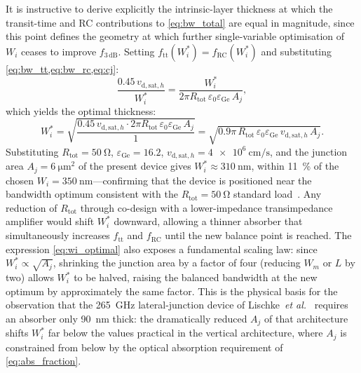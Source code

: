 
It is instructive to derive explicitly the intrinsic-layer thickness at which
the transit-time and RC contributions to \cref{eq:bw_total} are equal in
magnitude, since this point defines the geometry at which further single-variable
optimisation of $W_i$ ceases to improve $f_{3\,\mathrm{dB}}$. Setting
$f_{\mathrm{tt}}(W_i^*) = f_{\mathrm{RC}}(W_i^*)$ and substituting
\cref{eq:bw_tt,eq:bw_rc,eq:cj}:
\begin{equation}
    \frac{0.45\,v_{\mathrm{d,sat},h}}{W_i^*}
    = \frac{W_i^*}{2\pi R_{\mathrm{tot}}\,\varepsilon_0\varepsilon_{\mathrm{Ge}}\,A_j},
    \label{eq:wi_optimal_eq}
\end{equation}
which yields the optimal thickness:
\begin{equation}
    W_i^* = \sqrt{
      \frac{0.45\,v_{\mathrm{d,sat},h}\cdot
            2\pi R_{\mathrm{tot}}\,\varepsilon_0\varepsilon_{\mathrm{Ge}}\,A_j}{1}
    }
    = \sqrt{0.9\pi\,R_{\mathrm{tot}}\,\varepsilon_0\varepsilon_{\mathrm{Ge}}
             \,v_{\mathrm{d,sat},h}\,A_j}.
    \label{eq:wi_optimal}
\end{equation}
Substituting $R_{\mathrm{tot}} = \SI{50}{\ohm}$, $\varepsilon_{\mathrm{Ge}} =
16.2$, $v_{\mathrm{d,sat},h} = \SI{4e6}{\centi\metre\per\second}$, and the
junction area $A_j = \SI{6}{\micro\metre\squared}$ of the present device gives
$W_i^* \approx \SI{310}{\nano\metre}$, within \SI{11}{\percent} of the chosen
$W_i = \SI{350}{\nano\metre}$—confirming that the device is positioned near
the bandwidth optimum consistent with the $R_{\mathrm{tot}} = \SI{50}{\ohm}$
standard load~\cite{Yan2024}. Any reduction of $R_{\mathrm{tot}}$ through
co-design with a lower-impedance transimpedance amplifier would shift $W_i^*$
downward, allowing a thinner absorber that simultaneously increases
$f_{\mathrm{tt}}$ and $f_{\mathrm{RC}}$ until the new balance point is
reached. The expression \cref{eq:wi_optimal} also exposes a fundamental scaling
law: since $W_i^* \propto \sqrt{A_j}$, shrinking the junction area by a factor
of four (reducing $W_m$ or $L$ by two) allows $W_i^*$ to be halved, raising
the balanced bandwidth at the new optimum by approximately the same factor. This
is the physical basis for the observation that the \SI{265}{\giga\hertz}
lateral-junction device of Lischke~\textit{et al.}~\cite{Lischke2021} requires
an absorber only \SI{90}{\nano\metre} thick: the dramatically reduced $A_j$ of
that architecture shifts $W_i^*$ far below the values practical in the vertical
architecture, where $A_j$ is constrained from below by the optical absorption
requirement of \cref{eq:abs_fraction}.

